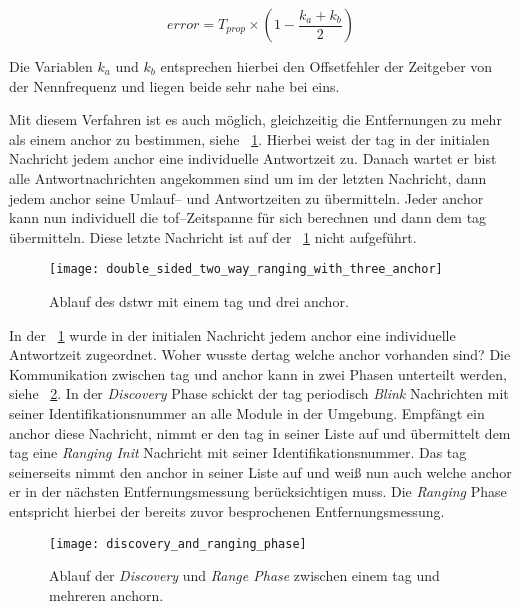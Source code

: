 \[error=T_{prop}\times\left(1-\frac{k_a+k_b}{2}\right)\] 

Die Variablen $k_a$ und $k_b$ entsprechen hierbei den Offsetfehler der Zeitgeber von der Nennfrequenz und liegen beide sehr nahe bei eins.

Mit diesem Verfahren ist es auch möglich, gleichzeitig die Entfernungen zu mehr als einem \Gls{anchor} zu bestimmen, siehe \figurename~\ref{fig:double_sided_two_way_ranging_with_three_anchor}. Hierbei weist der \Gls{tag} in der initialen Nachricht jedem \Gls{anchor} eine individuelle Antwortzeit zu. Danach wartet er bist alle Antwortnachrichten angekommen sind um im der letzten Nachricht, dann jedem \Gls{anchor} seine Umlauf-- und Antwortzeiten zu übermitteln. Jeder \Gls{anchor} kann nun individuell die \Gls{tof}--Zeitspanne für sich berechnen und dann dem \Gls{tag} übermitteln. Diese letzte Nachricht ist auf der \figurename~\ref{fig:double_sided_two_way_ranging_with_three_anchor} nicht aufgeführt.

\begin{figure}[ht]
	\centering
	\texttt{[image: double\_sided\_two\_way\_ranging\_with\_three\_anchor]}
	\caption{Ablauf des \acrlong{dstwr} mit einem \Gls{tag} und drei \Gls{anchor}.}
	\label{fig:double_sided_two_way_ranging_with_three_anchor}
\end{figure}

In der \figurename~\ref{fig:double_sided_two_way_ranging_with_three_anchor} wurde in der initialen Nachricht jedem \Gls{anchor} eine individuelle Antwortzeit zugeordnet. Woher wusste der\Gls{tag} welche \Gls{anchor} vorhanden sind? Die Kommunikation zwischen \Gls{tag} und \Gls{anchor} kann in zwei Phasen unterteilt werden, siehe \figurename~\ref{fig:discovery_and_ranging_phase}. In der \textit{Discovery} Phase schickt der \Gls{tag} periodisch \textit{Blink} Nachrichten mit seiner Identifikationsnummer an alle Module in der Umgebung. Empfängt ein \Gls{anchor} diese Nachricht, nimmt er den \Gls{tag} in seiner Liste auf und übermittelt dem \Gls{tag} eine \textit{Ranging Init} Nachricht mit seiner Identifikationsnummer. Das \Gls{tag} seinerseits nimmt den \Gls{anchor} in seiner Liste auf und weiß nun auch welche \Gls{anchor} er in der nächsten Entfernungsmessung berücksichtigen muss. Die \textit{Ranging} Phase entspricht hierbei der bereits zuvor besprochenen Entfernungsmessung.

\begin{figure}[ht]
	\centering
	\texttt{[image: discovery\_and\_ranging\_phase]}
	\caption{Ablauf der \textit{Discovery} und \textit{Range Phase} zwischen einem \Gls{tag} und mehreren \Gls{anchor}n.}
	\label{fig:discovery_and_ranging_phase}
\end{figure}


